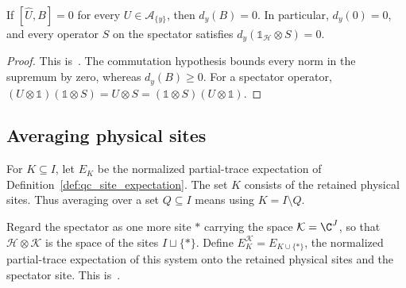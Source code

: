 \begin{lemma}
    \label{thm:qc_site_oscillation_commutant}
    \leanok
    If $[\widehat U,B]=0$ for every $U\in\mathcal A_{\{y\}}$, then
    $d_y(B)=0$. In particular, $d_y(0)=0$, and every operator $S$ on
    the spectator satisfies $d_y(\mathbb 1_{\mathcal H}\otimes S)=0$.
\end{lemma}
\begin{proof}
    \leanok
    This is~\cite[``Vanishing on the physical
        commutant'']{QICLean2026Blueprint}.
    The commutation hypothesis bounds every norm in the supremum by
    zero, whereas $d_y(B)\ge0$. For a spectator operator,
    $(U\otimes\mathbb 1)(\mathbb 1\otimes S)=U\otimes S
        =(\mathbb 1\otimes S)(U\otimes\mathbb 1)$.
\end{proof}

\subsection{Averaging physical sites}
\label{sec:qc_spectator_expectation}

For $K\subseteq I$, let $E_K$ be the normalized partial-trace expectation
of Definition~\ref{def:qc_site_expectation}. The set $K$ consists of the
retained physical sites. Thus averaging over a set $Q\subseteq I$
means using $K=I\setminus Q$.

\begin{definition}
    \label{def:qc_spectator_expectation}
    \leanok
    Regard the spectator as one more site $\ast$ carrying the space
    $\mathcal K=\C^J$, so that $\mathcal H\otimes\mathcal K$ is the space of
    the sites $I\sqcup\{\ast\}$. Define $E_K^{\mathcal K}=E_{K\cup\{\ast\}}$,
    the normalized partial-trace expectation of this system onto the retained
    physical sites and the spectator site.
    This is~\cite[``Site expectation with a spectator'']{QICLean2026Blueprint}.
\end{definition}

